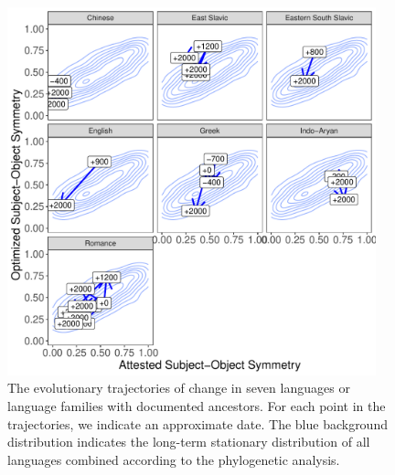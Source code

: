 \documentclass[11pt,a4paper]{article}
\newcommand\comment[1]{{\color{red}#1}}
\newcommand\mhahn[1]{{\color{red}(#1)}}
\begin{document}
\begin{figure}
    \centering
    \includegraphics[width=0.95\textwidth]{../analysis/figures/historical_2.6_times_stationary.pdf}
    \caption{The evolutionary trajectories of change in seven languages or language families with documented ancestors. For each point in the trajectories, we indicate an approximate date. The blue background distribution indicates the long-term stationary distribution of all languages combined according to the phylogenetic analysis. }
    \label{fig:historical}
\end{figure}





\end{document}
